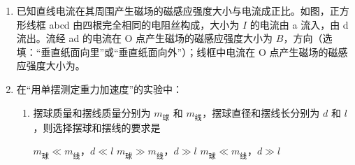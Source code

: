 \documentclass[\gkver]{gaokaozhenti}
\begin{document}
\begin{enumerate}
{（1）由微元的思想，可将环形圆环看成由 $n$ 个带电量为 $Q'$（$Q'=\frac{Q}{n}$）的点电荷，则点电荷 $q$ 受到的静电力可看成 $n$ 个 $Q'$ 对 $q$ 的静电力竖直分量的累积，即 $F=nF'\cos\theta=nk\frac{\frac{Q}{n}\cdot q}{L^{2}}\cos\theta$，显然 $F<k\frac{Qq}{d^{2}}$。

（2）由库仑定律可知 $k$ 的单位为 $\UNmqCq$，而 N 用基本单位可表示为 $\Ukgmsq$，C 用基本单位可表示为 $\UAcdots$，因此 $k$ 用基本单位的表示为 $\UkgmcmsqAq$。
}

\item
已知直线电流在其周围产生磁场的磁感应强度大小与电流成正比。如图，正方形线框 abcd 由四根完全相同的电阻丝构成，大小为 $I$ 的电流由 a 流入，由 d 流出。流经 ad 的电流在 O 点产生磁场的磁感应强度大小为 $B$，方向（选填：“垂直纸面向里”或“垂直纸面向外”）；线框中电流在 O 点产生磁场的磁感应强度大小为。
\onepicture[align=right, w=3.20cm]{}

\item
在“用单摆测定重力加速度”的实验中：
\begin{enumerate}
	\item
	摆球质量和摆线质量分别为 $m_{\text{球}}$ 和 $m_{\text{线}}$，摆球直径和摆线长分别为 $d$ 和 $l$，则选择摆球和摆线的要求是

	{$m_{\text{球}} \ll m_{\text{线}}$，$d \ll l$}
	{$m_{\text{球}} \gg m_{\text{线}}$，$d \gg l$}
	{$m_{\text{球}} \ll m_{\text{线}}$，$d \gg l$}


\end{enumerate}
\end{enumerate}
\end{document}
